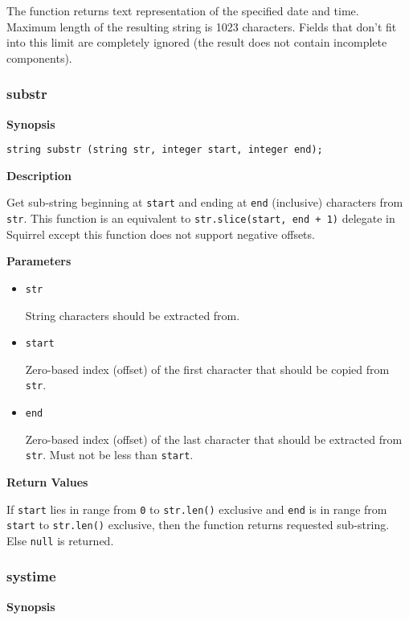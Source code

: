 \documentclass[a4paper, 10pt, titlepage]{article}
\begin{document}
The function returns text representation of the specified date and time. Maximum length of the resulting string is 1023 characters. Fields that don't fit into this limit are completely ignored (the result does not contain incomplete components).

\subsubsection{substr}

\textbf{Synopsis}

\begin{verbatim}
string substr (string str, integer start, integer end);
\end{verbatim}

\textbf{Description}

Get sub-string beginning at \texttt{start} and ending at \texttt{end} (inclusive) characters from \texttt{str}. This function is an equivalent to \texttt{str.slice(start, end + 1)} delegate in Squirrel except this function does not support negative offsets.

\textbf{Parameters}

\begin{itemize}
\item \texttt{str}

String characters should be extracted from.

\item \texttt{start}

Zero-based index (offset) of the first character that should be copied from \texttt{str}.

\item \texttt{end}

Zero-based index (offset) of the last character that should be extracted from \texttt{str}. Must not be less than \texttt{start}.
\end{itemize}

\textbf{Return Values}

If \texttt{start} lies in range from \texttt{0} to \texttt{str.len()} exclusive and \texttt{end} is in range from \texttt{start} to \texttt{str.len()} exclusive, then the function returns requested sub-string. Else \texttt{null} is returned.

\subsubsection{systime}

\textbf{Synopsis}
\end{document}
